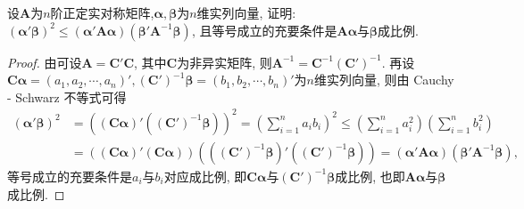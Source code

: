 \documentclass[../../main.tex]{subfiles}
\begin{document}
\begin{example}
设$\boldsymbol{A}$为$n$阶正定实对称矩阵,$\boldsymbol{\alpha}, \boldsymbol{\beta}$为$n$维实列向量, 证明: $(\boldsymbol{\alpha}'\boldsymbol{\beta})^2\leqslant  (\boldsymbol{\alpha}'\boldsymbol{A}\boldsymbol{\alpha})(\boldsymbol{\beta}'\boldsymbol{A}^{-1}\boldsymbol{\beta})$, 且等号成立的充要条件是$\boldsymbol{A}\boldsymbol{\alpha}$与$\boldsymbol{\beta}$成比例.
\end{example}
\begin{proof}
由可设$\boldsymbol{A}=\boldsymbol{C}'\boldsymbol{C}$, 其中$\boldsymbol{C}$为非异实矩阵, 则$\boldsymbol{A}^{-1}=\boldsymbol{C}^{-1}(\boldsymbol{C}')^{-1}$. 再设$\boldsymbol{C}\boldsymbol{\alpha}=(a_1, a_2, \cdots, a_n)', (\boldsymbol{C}')^{-1}\boldsymbol{\beta}=(b_1, b_2, \cdots, b_n)'$为$n$维实列向量, 则由 Cauchy - Schwarz 不等式可得
\begin{align*}
(\boldsymbol{\alpha}'\boldsymbol{\beta})^2 
&= ((\boldsymbol{C}\boldsymbol{\alpha})'((\boldsymbol{C}')^{-1}\boldsymbol{\beta}))^2 = \left(\sum_{i = 1}^n a_ib_i\right)^2\leqslant  \left(\sum_{i = 1}^n a_i^2\right)\left(\sum_{i = 1}^n b_i^2\right)\\
&= ((\boldsymbol{C}\boldsymbol{\alpha})'(\boldsymbol{C}\boldsymbol{\alpha}))((( \boldsymbol{C}')^{-1}\boldsymbol{\beta})'((\boldsymbol{C}')^{-1}\boldsymbol{\beta})) = (\boldsymbol{\alpha}'\boldsymbol{A}\boldsymbol{\alpha})(\boldsymbol{\beta}'\boldsymbol{A}^{-1}\boldsymbol{\beta}),
\end{align*}
等号成立的充要条件是$a_i$与$b_i$对应成比例, 即$\boldsymbol{C}\boldsymbol{\alpha}$与$(\boldsymbol{C}')^{-1}\boldsymbol{\beta}$成比例, 也即$\boldsymbol{A}\boldsymbol{\alpha}$与$\boldsymbol{\beta}$成比例. 

\end{proof}
\end{document}
